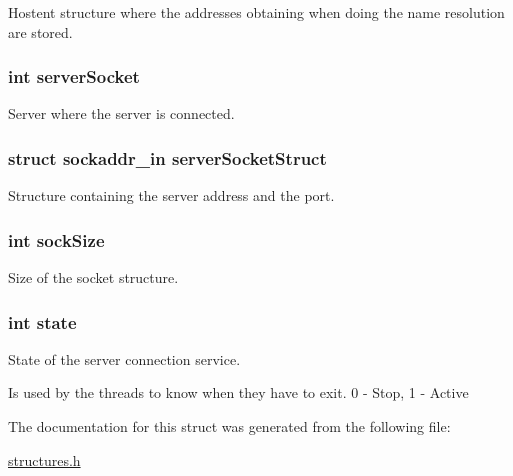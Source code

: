 Hostent structure where the addresses obtaining when doing the name resolution are stored. 

\subsubsection[{\texorpdfstring{server\+Socket}{serverSocket}}]{\setlength{\rightskip}{0pt plus 5cm}int server\+Socket}\hypertarget{struct_s_s_c___s_t_a_t_a106cd1d02a334c78f546d2897a1b939c}{}\label{struct_s_s_c___s_t_a_t_a106cd1d02a334c78f546d2897a1b939c}


Server where the server is connected. 

\subsubsection[{\texorpdfstring{server\+Socket\+Struct}{serverSocketStruct}}]{\setlength{\rightskip}{0pt plus 5cm}struct sockaddr\+\_\+in server\+Socket\+Struct}\hypertarget{struct_s_s_c___s_t_a_t_aa6596d8b411e7221fd256518fe443060}{}\label{struct_s_s_c___s_t_a_t_aa6596d8b411e7221fd256518fe443060}


Structure containing the server address and the port. 

\subsubsection[{\texorpdfstring{sock\+Size}{sockSize}}]{\setlength{\rightskip}{0pt plus 5cm}int sock\+Size}\hypertarget{struct_s_s_c___s_t_a_t_a67eae050a73c271691a9fb1280b4b358}{}\label{struct_s_s_c___s_t_a_t_a67eae050a73c271691a9fb1280b4b358}


Size of the socket structure. 

\subsubsection[{\texorpdfstring{state}{state}}]{\setlength{\rightskip}{0pt plus 5cm}int state}\hypertarget{struct_s_s_c___s_t_a_t_a89f234133d3efe315836311cbf21c64b}{}\label{struct_s_s_c___s_t_a_t_a89f234133d3efe315836311cbf21c64b}


State of the server connection service. 

Is used by the threads to know when they have to exit. 0 -\/ Stop, 1 -\/ Active 

The documentation for this struct was generated from the following file\+:\begin{DoxyCompactItemize}
\item 
\hyperlink{structures_8h}{structures.\+h}\end{DoxyCompactItemize}
